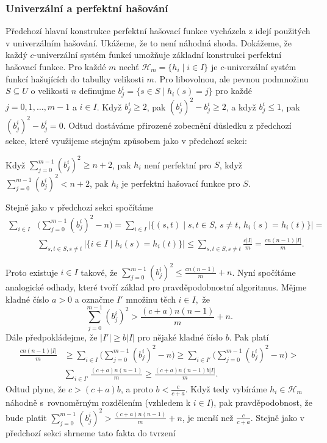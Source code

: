 \documentclass[a4paper,12pt]{article}
\begin{document}
\subsubsection{Univerzální a perfektní hašování}

Předchozí hlavní konstrukce perfektní hašovací funkce 
vycházela z idejí použitých v univerzálním hašování.  Ukážeme, 
že to není náhodná shoda. Dokážeme, že každý $
c$-univerzální 
systém funkcí umožňuje základní konstrukci perfektní hašovací 
funkce.  Pro každé $m$ nechť $\mathcal H_m=\{h_i\mid i\in I\}$ je $
c$-univerzální 
systém funkcí hašujících do ta\-bulky velikosti $
m$. Pro 
libovolnou, ale pevnou podmnožinu $S\subseteq U$ o velikosti $
n$ definujme 
$b_j^i=\{s\in S\mid h_i(s)=j\}$ pro každé $j=0,1,\dots,m-1$ a $
i\in I$. Když 
$b^i_j\ge 2$, pak $(b^i_j)^2-b^i_j\ge 2$, a když $b^i_j\le 1$, pak $
(b^i_j)^2-b^i_j=0$. Odtud 
dostáváme přirozené zobecnění důsledku z předchozí 
sekce, které využijeme stejným způsobem jako v 
předchozí sekci:

\begin{dusledek}Když $\sum_{j=0}^{m-1}(b^i_j)^2\ge n+2$, pak $h_i$ není 
perfektní pro $S$, když $\sum_{j=0}^{m-1}(b^i_j)^2<n+2$, pak $h_i$ je perfektní 
hašovací funkce pro $S$.
\end{dusledek}

Stejně jako v předchozí sekci spočítáme  
\begin{align*}\sum_{i\in I}&\big(\sum_{j=0}^{m-1}(b^i_j)^2-n\big)=\sum_{
i\in I}|\{(s,t)\mid s,t\in S,\,s\ne t,\,h_i(s)=h_i(t)\}|=\\
&\sum_{s,t\in S,s\ne t}|\{i\in I\mid h_i(s)=h_i(t)\}|\le\sum_{s,t
\in S,s\ne t}\frac {c|I|}m=\frac {cn(n-1)|I|}m.\end{align*}

Proto existuje $i\in I$ takové, že $\sum_{j=0}^{m-
1}(b^i_j)^2\le\frac {cn(n-1)}m+n$. Nyní 
spočítáme analogické odhady, které tvoří základ pro 
pravděpodobnostní algoritmus. Mějme kladné číslo $
a>0$ a 
označme $I'$ množinu těch $i\in I,$ že  
$$\sum_{j=0}^{m-1}(b^i_j)^2>\frac {(c+a)n(n-1)}m+n.$$
Dále předpokládejme, že $|I'|\ge b|I|$ pro 
nějaké kladné číslo $b$. Pak platí 
\begin{align*}\frac {cn(n-1)|I|}m&\ge\sum_{i\in I}\big(\sum_{j=0}^{m-1}
(b^i_j)^2-n\big)\ge\sum_{i\in I'}\big(\sum_{j=0}^{m-1}(b^i_j)^2-n\big
)>\\
&\sum_{i\in I'}\frac {(c+a)n(n-1)}m\ge\frac {(c+a)n(n-1)b|I|}m.\end{align*}
Odtud plyne, že $c>(c+a)b$, a proto $b<\frac c{c+a}$. Když tedy vybíráme  
$h_i\in \mathcal H_m$ náhodně s~rovnoměrným rozdělením (vzhledem k $
i\in I$), pak 
pravděpo\-dobnost, že bude platit $\sum_{j=0}^{m-1}(b^i_j)^
2>\frac {(c+a)n(n-1)}m+n$, je 
menší než $\frac c{c+a}$. Stejně jako v předchozí sekci shrneme tato fakta do tvrzení 
\end{document}
